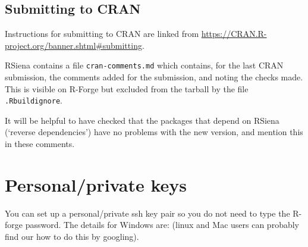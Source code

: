 \documentclass[12pt, a4paper]{article}
\renewcommand{\=}{\,=\,}
\newcommand{\+}{\,+\,}
\begin{document}
\subsection{Submitting to CRAN}
Instructions for submitting to CRAN are linked from
\url{ https://CRAN.R-project.org/banner.shtml#submitting}.

RSiena contains a file \texttt{cran-comments.md} which contains,
for the last CRAN submission, the comments added for the
submission, and noting the checks made.
This is visible on R-Forge but excluded from the tarball
by the file \texttt{.Rbuildignore}.

It will be helpful to have checked that the packages that depend
on RSiena (`reverse dependencies') have no problems with the
new version, and mention this in these comments.


\section{Personal/private keys}
\label{key}
You can set up a personal/private ssh key pair so you do not need to type the
R-forge password. The details for Windows are: (linux and Mac users can probably
find our how to do this by googling).
\end{document}
